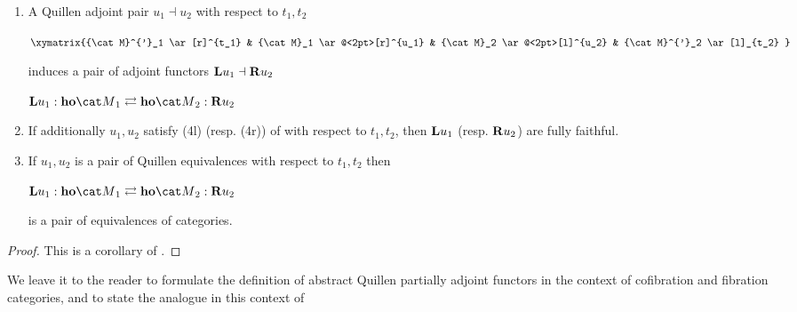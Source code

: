 \begin{thm}
\label{thm:quillenadjoint}
\mbox{}
\begin{enumerate}
\item
A Quillen adjoint pair $u_1 \dashv u_2$ with respect to $t_1, t_2$
\begin{center}
$\xymatrix {{\cat M}^{'}_1 \ar[r]^{t_1} & {\cat M}_1 \ar@<2pt>[r]^{u_1} & {\cat M}_2 \ar@<2pt>[l]^{u_2} & {\cat M}^{'}_2 \ar[l]_{t_2} }$
\end{center}
induces a pair of adjoint functors ${\bf L}u_1 \dashv {\bf R}u_2$
\begin{center}
${\bf L}u_1 : {\bf ho}{\cat M}_1 \rightleftarrows {\bf ho}{\cat M}_2 : {\bf R}u_2$
\end{center}
\item
If additionally $u_1, u_2$ satisfy (4l) (resp. (4r)) of  with respect to $t_1, t_2$, then ${\bf L}u_1$ (resp. ${\bf R}u_2$) are fully faithful.
\item
If $u_1, u_2$ is a pair of Quillen equivalences with respect to $t_1, t_2$ then
\begin{center}
${\bf L}u_1 : {\bf ho}{\cat M}_1 \rightleftarrows {\bf ho}{\cat M}_2 : {\bf R}u_2$
\end{center}
is a pair of equivalences of categories.
\end{enumerate}
\end{thm}

\begin{proof}
This is a corollary of .
\end{proof}

We leave it to the reader to formulate the definition of abstract Quillen partially adjoint functors in the context of cofibration and fibration categories, and to state the analogue in this context of  

